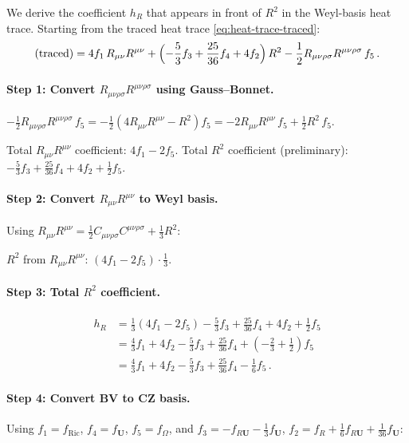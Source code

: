 \documentclass[11pt,a4paper]{article}
\newcommand{\Ricsq}{R_{\mu\nu}R^{\mu\nu}}
\newcommand{\Rsq}{R_{\mu\nu\rho\sigma}R^{\mu\nu\rho\sigma}}
\newcommand{\Weylsq}{C_{\mu\nu\rho\sigma}C^{\mu\nu\rho\sigma}}
\theoremstyle{definition}
\theoremstyle{remark}
\begin{document}
We derive the coefficient $h_R$ that appears in front of $R^2$ in the
Weyl-basis heat trace.  Starting from the traced heat trace
\eqref{eq:heat-trace-traced}:
\begin{equation*}
  \text{(traced)} = 4f_1\,\Ricsq
  + \Bigl(-\frac{5}{3}f_3 + \frac{25}{36}f_4 + 4f_2\Bigr)\,R^2
  - \frac{1}{2}\Rsq\,f_5\,.
\end{equation*}

\paragraph{Step 1: Convert $\Rsq$ using Gauss--Bonnet.}
$-\frac{1}{2}\Rsq\,f_5 = -\frac{1}{2}(4\Ricsq - R^2)f_5
= -2\Ricsq\,f_5 + \frac{1}{2}R^2\,f_5$.

Total $\Ricsq$ coefficient: $4f_1 - 2f_5$.
Total $R^2$ coefficient (preliminary):
$-\frac{5}{3}f_3 + \frac{25}{36}f_4 + 4f_2 + \frac{1}{2}f_5$.

\paragraph{Step 2: Convert $\Ricsq$ to Weyl basis.}
Using $\Ricsq = \frac{1}{2}\Weylsq + \frac{1}{3}R^2$:

$R^2$ from $\Ricsq$: $(4f_1 - 2f_5)\cdot\frac{1}{3}$.

\paragraph{Step 3: Total $R^2$ coefficient.}
\begin{align*}
  h_R &= \frac{1}{3}(4f_1 - 2f_5)
  - \frac{5}{3}f_3 + \frac{25}{36}f_4 + 4f_2 + \frac{1}{2}f_5\\
  &= \frac{4}{3}f_1 + 4f_2 - \frac{5}{3}f_3 + \frac{25}{36}f_4
  + \left(-\frac{2}{3} + \frac{1}{2}\right)f_5\\
  &= \frac{4}{3}f_1 + 4f_2 - \frac{5}{3}f_3 + \frac{25}{36}f_4
  - \frac{1}{6}f_5\,.
\end{align*}

\paragraph{Step 4: Convert BV to CZ basis.}
Using $f_1 = f_{\text{Ric}}$, $f_4 = f_{\mathbf{U}}$,
$f_5 = f_\Omega$, and
$f_3 = -f_{R\mathbf{U}} - \frac{1}{3}f_{\mathbf{U}}$,
$f_2 = f_R + \frac{1}{6}f_{R\mathbf{U}} + \frac{1}{36}f_{\mathbf{U}}$:
\end{document}
